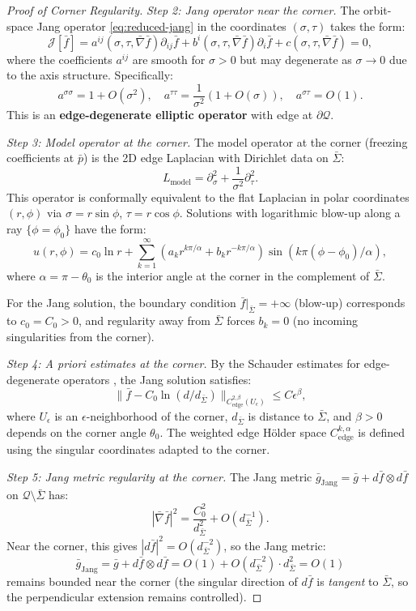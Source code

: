 \begin{remark}
\begin{proof}[Proof of Corner Regularity]
\textit{Step 2: Jang operator near the corner.}
The orbit-space Jang operator \eqref{eq:reduced-jang} in the coordinates $(\sigma, \tau)$ takes the form:
\[
\mathcal{J}[\bar{f}] = a^{ij}(\sigma, \tau, \bar{\nabla}\bar{f})\partial_{ij}\bar{f} + b^i(\sigma, \tau, \bar{\nabla}\bar{f})\partial_i\bar{f} + c(\sigma, \tau, \bar{\nabla}\bar{f}) = 0,
\]
where the coefficients $a^{ij}$ are smooth for $\sigma > 0$ but may degenerate as $\sigma \to 0$ due to the axis structure. Specifically:
\[
a^{\sigma\sigma} = 1 + O(\sigma^2), \quad a^{\tau\tau} = \frac{1}{\sigma^2}(1 + O(\sigma)), \quad a^{\sigma\tau} = O(1).
\]
This is an \textbf{edge-degenerate elliptic operator} with edge at $\partial\mathcal{Q}$.

\textit{Step 3: Model operator at the corner.}
The model operator at the corner (freezing coefficients at $\bar{p}$) is the 2D edge Laplacian with Dirichlet data on $\bar{\Sigma}$:
\[
L_{\text{model}} = \partial_\sigma^2 + \frac{1}{\sigma^2}\partial_\tau^2.
\]
This operator is conformally equivalent to the flat Laplacian in polar coordinates $(r, \phi)$ via $\sigma = r\sin\phi$, $\tau = r\cos\phi$. Solutions with logarithmic blow-up along a ray $\{\phi = \phi_0\}$ have the form:
\[
u(r, \phi) = c_0 \ln r + \sum_{k=1}^\infty (a_k r^{k\pi/\alpha} + b_k r^{-k\pi/\alpha})\sin(k\pi(\phi - \phi_0)/\alpha),
\]
where $\alpha = \pi - \theta_0$ is the interior angle at the corner in the complement of $\bar{\Sigma}$.

For the Jang solution, the boundary condition $\bar{f}|_{\bar{\Sigma}} = +\infty$ (blow-up) corresponds to $c_0 = C_0 > 0$, and regularity away from $\bar{\Sigma}$ forces $b_k = 0$ (no incoming singularities from the corner).

\textit{Step 4: A priori estimates at the corner.}
By the Schauder estimates for edge-degenerate operators \cite[Theorem 5.4.1]{schulze1998}, the Jang solution satisfies:
\[
\|\bar{f} - C_0\ln(d/d_{\bar{\Sigma}})\|_{C^{2,\beta}_{\text{edge}}(U_\epsilon)} \leq C\epsilon^\beta,
\]
where $U_\epsilon$ is an $\epsilon$-neighborhood of the corner, $d_{\bar{\Sigma}}$ is distance to $\bar{\Sigma}$, and $\beta > 0$ depends on the corner angle $\theta_0$. The weighted edge H\"older space $C^{k,\alpha}_{\text{edge}}$ is defined using the singular coordinates adapted to the corner.

\textit{Step 5: Jang metric regularity at the corner.}
The Jang metric $\bar{g}_{\text{Jang}} = \bar{g} + d\bar{f} \otimes d\bar{f}$ on $\mathcal{Q} \setminus \bar{\Sigma}$ has:
\[
|\bar{\nabla}\bar{f}|^2 = \frac{C_0^2}{d_{\bar{\Sigma}}^2} + O(d_{\bar{\Sigma}}^{-1}).
\]
Near the corner, this gives $|d\bar{f}|^2 = O(d_{\bar{\Sigma}}^{-2})$, so the Jang metric:
\[
\bar{g}_{\text{Jang}} = \bar{g} + d\bar{f} \otimes d\bar{f} = O(1) + O(d_{\bar{\Sigma}}^{-2}) \cdot d_{\bar{\Sigma}}^2 = O(1)
\]
remains bounded near the corner (the singular direction of $d\bar{f}$ is \textit{tangent} to $\bar{\Sigma}$, so the perpendicular extension remains controlled).


\end{proof}
\end{remark}
